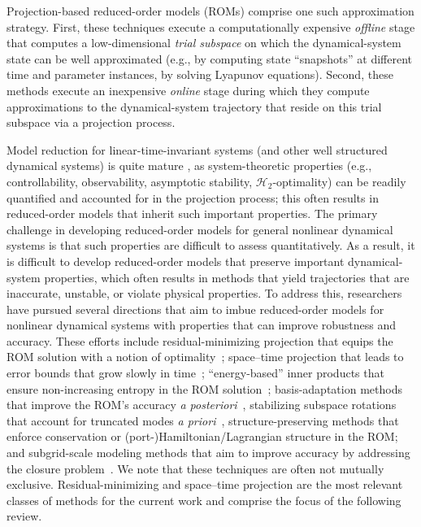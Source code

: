 \documentclass[3p,computermodern,10pt]{elsarticle}
\begin{document}
Projection-based reduced-order models (ROMs) comprise one such approximation
strategy. First, these techniques execute a computationally expensive
\textit{offline} stage that computes a low-dimensional \textit{trial subspace} on
which the dynamical-system state can be well approximated (e.g., by computing
state ``snapshots'' at different time and parameter instances, by solving
Lyapunov equations). Second, these methods execute an inexpensive
\textit{online} stage during which they compute approximations to the
dynamical-system trajectory that reside on this trial subspace via a
projection process.
 
Model reduction for linear-time-invariant systems (and other well structured
dynamical systems) is quite mature
\cite{wilcox_benner_rev,moore,roberts,GugercinIRKA}, as system-theoretic properties (e.g., controllability,
observability, asymptotic stability, $\mathcal H_2$-optimality) can be readily
quantified and accounted for in the projection process; this often results in
reduced-order models that inherit such important properties.  The primary
challenge in
developing reduced-order models for general nonlinear dynamical systems is
that such properties are difficult to assess quantitatively. As a result, it
is difficult to develop reduced-order models that preserve important
dynamical-system properties, which often results in methods that yield
trajectories that are
inaccurate, unstable, or violate physical properties.  To address this, researchers have pursued several directions that
aim to imbue reduced-order models for nonlinear
dynamical systems with properties that can improve robustness and accuracy.
These
efforts include residual-minimizing
projection that equips the ROM solution with a notion of optimality~\cite{carlberg_lspg,carlberg_gnat,legresley_1,legresley_2,legresley_3,bui_resmin_steady,bui_unsteady,rovas_thesis,carlberg_thesis,bui_thesis,l1};
space--time
projection that leads to error bounds that grow slowly in time~\cite{choi_stlspg,constantine_strom,URBAN2012203,Yano2014ASC,benner_st};
``energy-based'' inner
products that ensure non-increasing entropy in the ROM
solution~\cite{rowley_pod_energyproj,Kalashnikova_sand2014,chan2019entropy};
basis-adaptation methods that improve the ROM's accuracy \textit{a
posteriori}~\cite{carlberg_hadaptation,adeim_peherstorfer,etter2019online}, stabilizing subspace rotations that account for truncated modes \textit{a priori}~\cite{basis_rotation}, structure-preserving
methods that enforce conservation \cite{carlberg_conservative_rom} or
(port-)Hamiltonian/Lagrangian structure
\cite{LALL2003304,carlberg2012spd,structurePreserveBeattie,chaturantabut2016structure,farhat2014dimensional} in the ROM; and subgrid-scale
modeling methods that aim to improve accuracy by addressing the closure
problem~\cite{san_iliescu_geostrophic,iliescu_pod_eddyviscosity,iliescu_vms_pod_ns,Bergmann_pod_vms,iliescu_ciazzo_residual_rom,Wang_ROM_thesis,wentland_apg,Wang:269133,San2018}.
We note that these techniques are often not mutually exclusive.
Residual-minimizing and space--time projection are the most relevant classes of
methods for the current work and comprise the focus of the following review.
\end{document}
